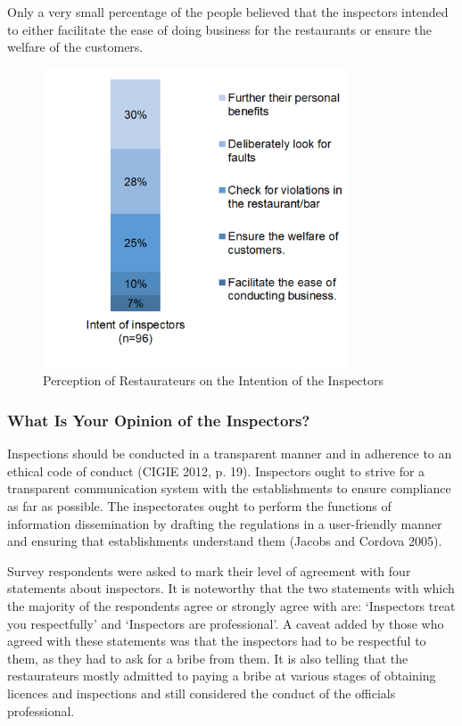 \documentclass[a4paper, 12pt]{article}
\begin{document}
		Only a very small percentage of the people believed that the inspectors intended to either facilitate the ease of doing business for the restaurants or ensure the welfare of the customers.

		\begin{figure}[H]
                    	\centering
                    	\includegraphics[height = 3.5in]{Figure7.png}
                    	\caption[Optional Caption]{Perception of Restaurateurs on the Intention of the Inspectors} %
		\end{figure}

		\subsubsection {What Is Your Opinion of the Inspectors?}
				
		Inspections should be conducted in a transparent manner and in adherence to an ethical code of conduct (CIGIE 2012, p. 19). Inspectors ought to strive for a transparent communication system with the establishments to ensure compliance as far as 
possible. The inspectorates ought to perform the functions of information dissemination by drafting the regulations in a user-friendly manner and ensuring that establishments understand them (Jacobs and Cordova 2005).
		
		Survey respondents were asked to mark their level of agreement with four statements about inspectors. It is noteworthy that the two statements with which the majority of the respondents agree or strongly agree with are: ‘Inspectors treat you respectfully’ 
and ‘Inspectors are professional’. A caveat added by those who agreed with these statements was that the inspectors had to be respectful to them, as they had to ask for a bribe from them. It is also telling that the restaurateurs mostly admitted to paying a bribe at 
various stages of obtaining licences and inspections and still considered the conduct of the officials professional.
		
\end{document}
